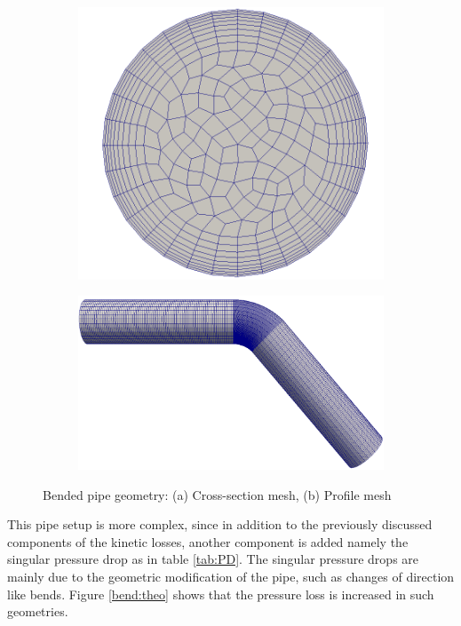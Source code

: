 \documentclass[11pt]{report}
\begin{document}
\begin{figure}[ht!]
\centering
\begin{subfigure}{0.40\textwidth}
\includegraphics[scale =0.09]{figs/section.png}
\caption{}
\end{subfigure}
\begin{subfigure}{0.40\textwidth}
\includegraphics[scale = 0.17]{figs/bend.png}
\caption{}
\end{subfigure}
\caption{Bended pipe geometry: (a) Cross-section mesh, (b) Profile mesh }
\label{bend}
\end{figure}
%
 This pipe setup is more complex, since in addition to the previously discussed components of the  kinetic losses, another component is added namely the singular pressure drop as in table \ref{tab:PD}. 
 The singular pressure drops are mainly due to the geometric modification of the pipe, such as changes of direction like bends. 
 Figure \ref{bend:theo} shows that the pressure loss is increased in such geometries.
\end{document}
